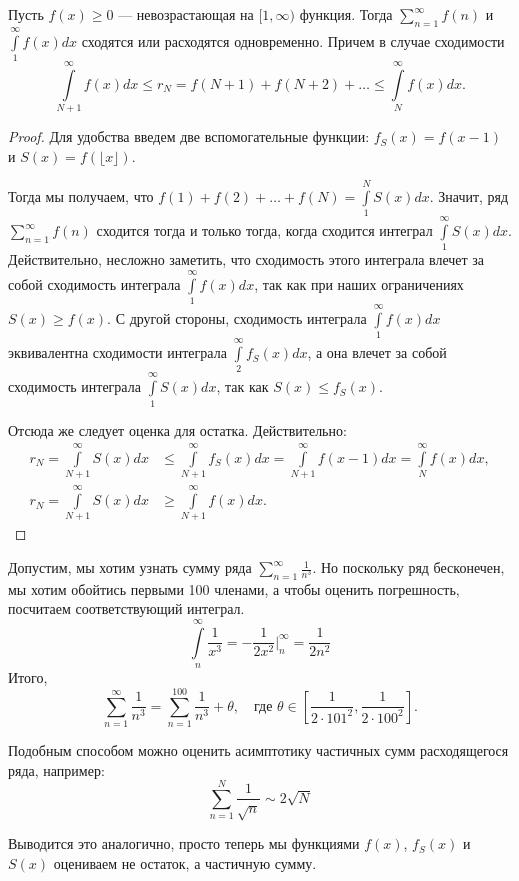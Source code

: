 \begin{Test}

Пусть $f(x) \geqslant 0$ --- невозрастающая на $[1, \infty)$ функция. Тогда $\sum\limits_{n=1}^{\infty}f(n)$ и $\int\limits_1^{\infty}f(x)dx$ сходятся или расходятся одновременно. Причем в случае сходимости
$$
\int\limits_{N+1}^{\infty}f(x)dx \leqslant r_N = f(N+1) + f(N+2) + \ldots \leqslant \int\limits_N^\infty f(x)dx.
$$
\end{Test}

\begin{proof}
Для удобства введем две вспомогательные функции: $f_S(x) = f(x-1)$ и $S(x) = f(\lfloor x \rfloor)$.




Тогда мы получаем, что $f(1) + f(2) + \ldots + f(N) = \int\limits_1^N S(x)dx$. Значит, ряд $\sum\limits_{n=1}^\infty f(n)$ сходится тогда и только тогда, когда сходится интеграл $\int\limits_1^\infty S(x)dx$. Действительно, несложно заметить, что сходимость этого интеграла влечет за собой сходимость интеграла $\int\limits^\infty_1 f(x)dx$, так как  при наших ограничениях $S(x) \geqslant f(x)$. С другой стороны, сходимость интеграла $\int\limits_1^\infty f(x)dx$ эквивалентна сходимости интеграла $\int\limits_2^\infty f_S(x)dx$, а она влечет за собой сходимость интеграла $\int\limits_1^\infty  S(x)dx$, так как $S(x) \leq f_S(x)$.

Отсюда же следует оценка для остатка. Действительно:
\begin{align*}
r_{N} = \int\limits_{N+1}^\infty S(x) dx & \leqslant \int\limits_{N+1}^\infty f_S(x)dx = \int\limits_{N+1}^\infty f(x-1)dx = \int\limits_N^\infty f(x)dx, \\
r_{N} = \int\limits_{N+1}^\infty S(x)dx & \geqslant \int\limits_{N+1}^{\infty}f(x)dx.
\end{align*}
\end{proof}

\begin{Examples}
Допустим, мы хотим узнать сумму ряда $\sum\limits_{n=1}^{\infty}\frac{1}{n^3}$. Но поскольку ряд бесконечен, мы хотим обойтись первыми 100 членами, а чтобы оценить погрешность, посчитаем соответствующий интеграл.
$$
\int\limits_{n}^\infty \frac{1}{x^3} = -\frac{1}{2x^2} \Big|^\infty_{n} = \frac{1}{2n^2}
$$
Итого,
$$
\sum\limits_{n=1}^{\infty}\frac{1}{n^3} = \sum\limits_{n=1}^{100}\frac{1}{n^3} + \theta, \quad \text{где } \theta \in \left[\frac{1}{2\cdot101^2}, \frac{1}{2\cdot 100^2}\right].
$$

\end{Examples}

Подобным способом можно оценить асимптотику частичных сумм расходящегося ряда, например:
$$
\sum_{n=1}^{N} \frac{1}{\sqrt{n}} \sim 2\sqrt{N}
$$

Выводится это аналогично, просто теперь мы функциями $f(x)$, $f_S(x)$ и $S(x)$ оцениваем не остаток, а частичную сумму.


